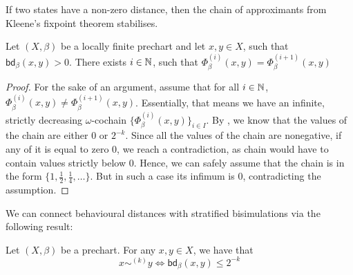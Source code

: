 If two states have a non-zero distance, then the chain of approximants from Kleene's fixpoint theorem stabilises.
\begin{lemma}\label{lem:chain_stabilises}
	Let $(X, \beta)$ be a locally finite prechart and let $x,y \in X$, such that $\mathsf{bd}_\beta(x,y)>0$. There exists $i \in \mathbb{N}$, such that $\Phi_\beta^{(i)}(x,y)=\Phi^{(i+1)}_\beta(x,y)$
\end{lemma}
\begin{proof}
	For the sake of an argument, assume that for all $i \in \mathbb{N}$, $\Phi_\beta^{(i)}(x,y)\neq\Phi^{(i+1)}_\beta(x,y)$. Essentially, that means we have an infinite, strictly decreasing $\omega$-cochain $\{\Phi^{(i)}_\beta(x,y)\}_{i \in I}$. By , we know that the values of the chain are either $0$ or $2^{-k}$. Since all the values of the chain are nonegative, if any of it is equal to zero $0$, we reach a contradiction, as chain would have to contain values strictly below $0$. Hence, we can safely assume that the chain is in the form $\{1,\frac{1}{2}, \frac{1}{4}, \dots\}$. But in such a case its infimum is $0$, contradicting the assumption.
\end{proof}
We can connect behavioural distances with stratified bisimulations via the following result:
\begin{lemma}\label{lem:bound_on_stratified_bisim}
	Let $(X, \beta)$ be a prechart. For any $x,y \in X$, we have that 
	$$
	x \sim^{(k)} y \iff \mathsf{bd}_{\beta}(x,y) \leq 2^{-k}
	$$
\end{lemma}
